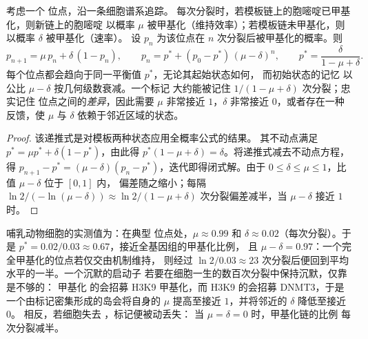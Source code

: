 \begin{theorem}[甲基化状态在分裂中的维持]\label{thm:b3:chromatin-epigenetics:maintenance}
考虑一个  位点，沿一条细胞谱系追踪。
每次分裂时，若模板链上的胞嘧啶已甲基化，则新链上的胞嘧啶
以概率 $\mu$ 被甲基化（维持效率）；若模板链未甲基化，则
以概率 $\delta$ 被甲基化（速率）。
设 $p_{n}$ 为该位点在 $n$
次分裂后被甲基化的概率。则
\[
p_{n+1} = \mu\, p_{n} + \delta\,(1 - p_{n}),
\qquad
p_{n} = p^{*} + (p_{0} - p^{*})\,(\mu - \delta)^{n},
\qquad
p^{*} = \frac{\delta}{1 - \mu + \delta}.
\]
每个位点都会趋向于同一平衡值 $p^{*}$，无论其起始状态如何，
而初始状态的记忆
以公比 $\mu - \delta$ 按几何级数衰减。一个标记
大约能被记住 $1/(1 - \mu + \delta)$ 次分裂；忠实记住
位点之间的\emph{差异}，因此需要 $\mu$ 非常接近
$1$，$\delta$ 非常接近 $0$，或者存在一种反馈，使 $\mu$ 与
$\delta$ 依赖于邻近区域的状态。
\end{theorem}
\begin{proof}
该递推式是对模板两种状态应用全概率公式的结果。
其不动点满足 $p^{*} = \mu p^{*} + \delta(1 -
p^{*})$，由此得 $p^{*}(1 - \mu + \delta) = \delta$。将递推式减去不动点方程，
得 $p_{n+1} - p^{*} = (\mu -
\delta)(p_{n} - p^{*})$，迭代即得闭式解。由于
$0 \le \delta \le \mu \le 1$，比值 $\mu - \delta$ 位于 $[0,1]$ 内，
偏差随之缩小；每隔 $\ln 2 / (-\ln(\mu -
\delta)) \approx \ln 2/(1 - \mu + \delta)$ 次分裂偏差减半，当 $\mu -
\delta$ 接近 $1$ 时。
\end{proof}

\begin{example}[数值]\label{ex:b3:chromatin-epigenetics:maintenance-numbers}
哺乳动物细胞的实测值为：在典型  位点处，$\mu \approx 0.99$ 和
$\delta \approx 0.02$（每次分裂）。于是 $p^{*} =
0.02/0.03 \approx 0.67$，接近全基因组的甲基化比例，
且 $\mu - \delta = 0.97$：一个完全甲基化的位点若仅交由机制维持，
则经过 $\ln 2 /
0.03 \approx 23$ 次分裂后便回到平均水平的一半。一个沉默的启动子
若要在细胞一生的数百次分裂中保持沉默，仅靠  是不够的：
甲基化  的会招募 H3K9 甲基化，而 H3K9
的会招募 DNMT3，于是一个由标记密集形成的岛会将自身的
$\mu$ 提高至接近 $1$，并将邻近的 $\delta$ 降低至接近 $0$。
相反，若细胞失去 ，标记便被动丢失：
当 $\mu = \delta = 0$ 时，甲基化链的比例
每次分裂减半。
\end{example}

